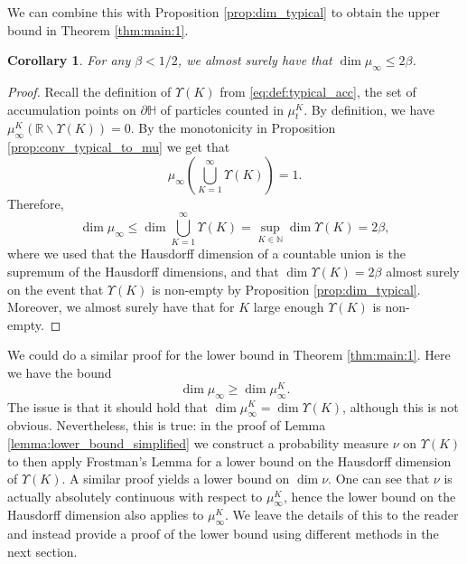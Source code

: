 \documentclass{article}
\newtheorem{cor}[thm]{Corollary}
\theoremstyle{definition}
\numberwithin{equation}{section}
\numberwithin{thm}{section}
\newcommand*{\RR}{\ensuremath{\mathbb{R}}}	        	%
\newcommand*{\NN}{\ensuremath{\mathbb{N}}}		        %
\newcommand*{\HH}{\ensuremath{\mathbb{H}}}	        	%
\begin{document}
We can combine this with Proposition \ref{prop:dim_typical} to obtain the upper bound in Theorem \ref{thm:main:1}.

\begin{cor}
    For any $\beta<1/2$, we almost surely have that $\dim \mu_\infty\leq 2\beta$.
\end{cor}

\begin{proof}
    Recall the definition of $\Upsilon(K)$ from \eqref{eq:def:typical_acc}, the set of accumulation points on $\partial \HH$ of particles counted in $\mu^K_t$. By definition, we have $\mu_\infty^K(\RR \backslash \Upsilon(K)) = 0$. By the monotonicity in Proposition \ref{prop:conv_typical_to_mu} we get that
    \begin{equation*}
        \mu_\infty\left( \bigcup_{K=1}^\infty \Upsilon(K)\right)=1.
    \end{equation*}
    Therefore,
    \begin{equation*}
        \dim\mu_\infty \leq \dim \bigcup_{K=1}^\infty \Upsilon(K) = \sup_{K\in \NN} \dim \Upsilon(K) = 2\beta,
    \end{equation*}
    where we used that the Hausdorff dimension of a countable union is the supremum of {the} Hausdorff dimensions, and that $\dim \Upsilon(K) = 2\beta$ almost surely on the event that $\Upsilon(K)$ is non-empty by Proposition \ref{prop:dim_typical}. {Moreover,} we almost surely have that for $K$ large enough $\Upsilon(K)$ is non-empty.
\end{proof}

We could do a similar proof for the lower bound in Theorem \ref{thm:main:1}. Here we have the bound
\begin{equation*}
    \dim \mu_\infty \geq \dim  \mu_\infty^K. 
\end{equation*}
The issue is that it should hold that $\dim  \mu_\infty^K = \dim \Upsilon(K)$, {although} this is not obvious. Nevertheless, this is true: in the proof of Lemma \ref{lemma:lower_bound_simplified} we construct a probability measure $\nu$ on $\Upsilon(K)$ to then apply Frostman's Lemma for a lower bound on the Hausdorff dimension of $\Upsilon(K)$. A similar proof yields a lower bound on $\dim \nu$. One can see that $\nu$ is actually absolutely continuous with respect to $\mu^K_\infty$, hence the lower bound on the Hausdorff dimension also applies to $\mu^K_\infty$. We leave the details of this to the reader and instead provide a proof of the lower bound using different methods in the next section.
\end{document}
